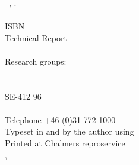 


\quad \vfill

\noindent
\textbf{\phdtitle}\\
\textsc{\phdauthor}\\
\\
\textcopyright\ \phdauthor, \phdyear.\\
\\
ISBN \phdisbn\\
Technical Report \phdtechreportno\\
\\
Research groups: \phdresearchgroup\\
\phddepartment\\
\phduniversity\\
SE-412 96 \phdcity \\
\phdcountry\\
Telephone +46 (0)31-772 1000\\

\noindent
Typeset in \mainfontfamily{} and \monofontfamily{} by the author using \XeTeX\\
Printed at Chalmers reproservice \\
\phdcity, \phdcountry ~\phdyear
